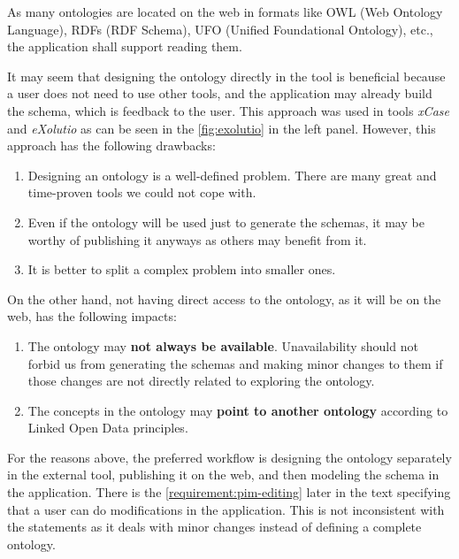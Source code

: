 \begin{requirement}
    \label{requirement:ontologies-on-the-web}
    As many ontologies are located on the web in formats like OWL (Web Ontology Language), RDFs (RDF Schema), UFO (Unified Foundational Ontology), etc., the application shall support reading them.
\end{requirement}

It may seem that designing the ontology directly in the tool is beneficial because a user does not need to use other tools, and the application may already build the schema, which is feedback to the user. This approach was used in tools \textit{xCase} and \textit{eXolutio} as can be seen in the \autoref{fig:exolutio} in the left panel. However, this approach has the following drawbacks:

\begin{enumerate}
    \item Designing an ontology is a well-defined problem. There are many great and time-proven tools we could not cope with.
    \item Even if the ontology will be used just to generate the schemas, it may be worthy of publishing it anyways as others may benefit from it.
    \item It is better to split a complex problem into smaller ones.
\end{enumerate}

On the other hand, not having direct access to the ontology, as it will be on the web, has the following impacts:

\begin{enumerate}
    \item The ontology may \textbf{not always be available}. Unavailability should not forbid us from generating the schemas and making minor changes to them if those changes are not directly related to exploring the ontology.
    \item The concepts in the ontology may \textbf{point to another ontology} according to Linked Open Data principles.
\end{enumerate}

For the reasons above, the preferred workflow is designing the ontology separately in the external tool, publishing it on the web, and then modeling the schema in the application. There is the \autoref{requirement:pim-editing} later in the text specifying that a user can do modifications in the application. This is not inconsistent with the statements as it deals with minor changes instead of defining a complete ontology.

